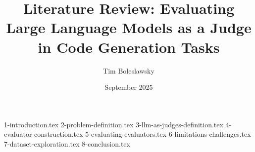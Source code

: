 \documentclass[conference]{IEEEtran}
\begin{document}
\thispagestyle{plain}
\pagestyle{plain}

\title{Literature Review: Evaluating Large Language Models as a Judge in Code Generation Tasks}
\author{Tim Boleslawsky}
\date{September 2025}

\maketitle

{1-introduction.tex}
{2-problem-definition.tex}
{3-llm-as-judges-definition.tex}
{4-evaluator-construction.tex}
{5-evaluating-evaluators.tex}
{6-limitations-challenges.tex}
{7-dataset-exploration.tex}
{8-conclusion.tex}



\vspace{12pt}
\end{document}
